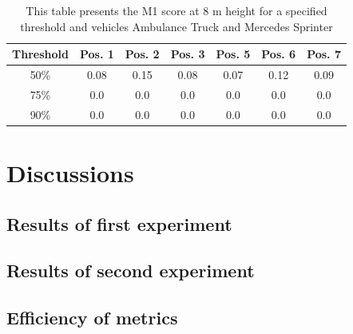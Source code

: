 \begin{table}[h]
\caption{This table presents the M1 score at 8 m height for a specified threshold and vehicles Ambulance Truck and Mercedes Sprinter\label{tab:amb_merc_threshold}}
\centering
    \begin{tabular}{ | c | c | c | c | c | c | c |}
    \hline
    Threshold & Pos. 1 & Pos. 2 & Pos. 3 & Pos. 5 & Pos. 6 & Pos. 7 \\ \hline
    50\% & 0.08 & 0.15 & 0.08 & 0.07 & 0.12 & 0.09\\ \hline
    75\% & 0.0 & 0.0 & 0.0 & 0.0 & 0.0 & 0.0\\ \hline
    90\% & 0.0 & 0.0 & 0.0 & 0.0 & 0.0 & 0.0\\ \hline
    \end{tabular}
\end{table}

\newpage
\section{Discussions}\label{discussions}
\subsection{Results of first experiment}
\subsection{Results of second experiment}
\subsection{Efficiency of metrics}